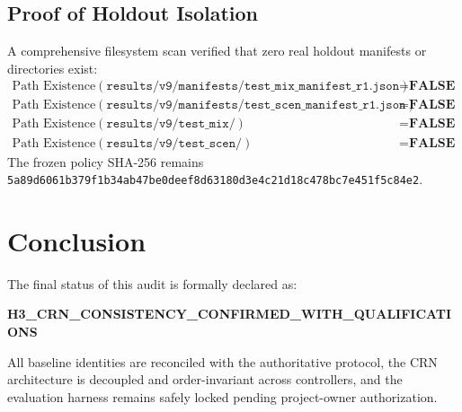 \documentclass[10pt,a4paper]{article}
\begin{document}
\subsection{Proof of Holdout Isolation}
A comprehensive filesystem scan verified that zero real holdout manifests or directories exist:
\begin{equation}
\begin{aligned}
    \text{Path Existence}(\texttt{results/v9/manifests/test\_mix\_manifest\_r1.json}) &= \textbf{FALSE} \\
    \text{Path Existence}(\texttt{results/v9/manifests/test\_scen\_manifest\_r1.json}) &= \textbf{FALSE} \\
    \text{Path Existence}(\texttt{results/v9/test\_mix/}) &= \textbf{FALSE} \\
    \text{Path Existence}(\texttt{results/v9/test\_scen/}) &= \textbf{FALSE}
\end{aligned}
\end{equation}
The frozen policy SHA-256 remains \texttt{5a89d6061b379f1b34ab47be0deef8d63180d3e4c21d18c478bc7e451f5c84e2}.

\section{Conclusion}
The final status of this audit is formally declared as:
\begin{center}
    \textbf{\Large H3\_CRN\_CONSISTENCY\_CONFIRMED\_WITH\_QUALIFICATIONS}
\end{center}
All baseline identities are reconciled with the authoritative protocol, the CRN architecture is decoupled and order-invariant across controllers, and the evaluation harness remains safely locked pending project-owner authorization.
\end{document}
